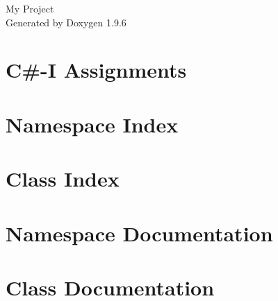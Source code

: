 \documentclass[twoside]{book}
\newcommand{\+}{\discretionary{\mbox{\scriptsize$\hookleftarrow$}}{}{}}
\newcommand{\clearemptydoublepage}{%
    \newpage{\pagestyle{empty}\cleardoublepage}%
  }
\begin{document}
  \raggedbottom
    \hypersetup{pageanchor=false,
                bookmarksnumbered=true,
                pdfencoding=unicode
               }
  \begin{titlepage}
  \vspace*{7cm}
  \begin{center}%
  {\Large My Project}\\
  \vspace*{1cm}
  {\large Generated by Doxygen 1.9.6}\\
  \end{center}
  \end{titlepage}
  \clearemptydoublepage
  \tableofcontents
  \clearemptydoublepage
  \hypersetup{pageanchor=true}
\chapter{C\#-\/I Assignments}
\label{md__c___users_bengt__desktop_coding__c___u_n_i__v_s__r_e_a_d_m_e}

\chapter{Namespace Index}

\chapter{Class Index}

\chapter{Namespace Documentation}



\chapter{Class Documentation}











  \backmatter
  \newpage
  \clearemptydoublepage
  \printindex
\end{document}
